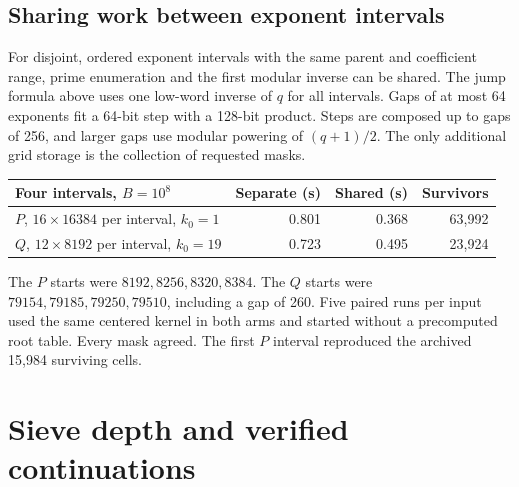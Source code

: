 \documentclass[11pt,a4paper,oneside,openany]{report}
\begin{document}
\section{Sharing work between exponent intervals}
For disjoint, ordered exponent intervals with the same parent and coefficient range, prime enumeration and the first modular inverse can be shared. The jump formula above uses one low-word inverse of $q$ for all intervals. Gaps of at most 64 exponents fit a 64-bit step with a 128-bit product. Steps are composed up to gaps of 256, and larger gaps use modular powering of $(q+1)/2$. The only additional grid storage is the collection of requested masks.
\begin{center}\small
\begin{tabular}{@{}lrrr@{}}\toprule
Four intervals, $B=10^8$ & Separate (s)& Shared (s)& Survivors\\\midrule
$P$, $16\times16384$ per interval, $k_0=1$ &0.801&0.368&63,992\\
$Q$, $12\times8192$ per interval, $k_0=19$ &0.723&0.495&23,924\\\bottomrule
\end{tabular}
\end{center}
The $P$ starts were $8192,8256,8320,8384$. The $Q$ starts were $79154,79185,79250,79510$, including a gap of 260. Five paired runs per input used the same centered kernel in both arms and started without a precomputed root table. Every mask agreed. The first $P$ interval reproduced the archived 15,984 surviving cells.

\chapter{Sieve depth and verified continuations}
\label{ch:depth}
\end{document}
